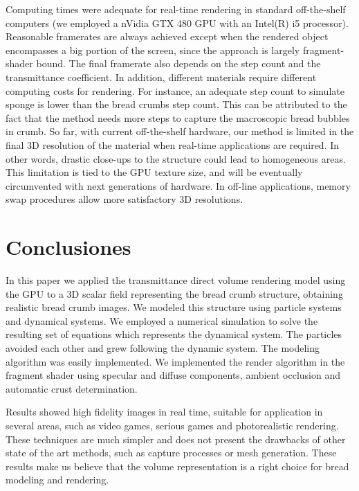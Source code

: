 
Computing times were adequate for real-time rendering in standard off-the-shelf computers (we employed a nVidia GTX 480 GPU with an Intel(R) i5 processor).
Reasonable framerates are always achieved except when the rendered object encompasses a big portion of the screen, since the approach is largely fragment-shader bound.
The final framerate also depends on the step count and the transmittance coefficient.
In addition, different materials require different computing costs for rendering.
For instance, an adequate step count to simulate sponge is lower than the bread crumbs step count.
This can be attributed to the fact that the method needs more steps to capture the macroscopic bread bubbles in crumb.
So far, with current off-the-shelf hardware, our method is limited in the final 3D resolution of the material when real-time applications are required.
In other words, drastic close-ups to the structure could lead to homogeneous areas.
This limitation is tied to the GPU texture size, and will be eventually circumvented with next generations of hardware.
In off-line applications, memory swap procedures allow more satisfactory 3D resolutions.


\section{Conclusiones}

In this paper we applied the transmittance direct volume rendering model using the GPU to a 3D scalar field representing the bread crumb structure, obtaining realistic bread crumb images.
We modeled this structure using particle systems and dynamical systems.
We employed a numerical simulation to solve the resulting set of equations which represents the dynamical system. 
The particles avoided each other and grew following the dynamic system.
The modeling algorithm was easily implemented. 
We implemented the render algorithm in the fragment shader using specular and diffuse components, ambient occlusion and automatic crust determination.

Results showed high fidelity images in real time, suitable for application in several areas, such as video games, serious games \cite{Susi2007} and photorealistic rendering. 
These techniques are much simpler and does not present the drawbacks of other state of the art methods, such as capture processes or mesh generation.
These results make us believe that the volume representation is a right choice for bread modeling and rendering.

